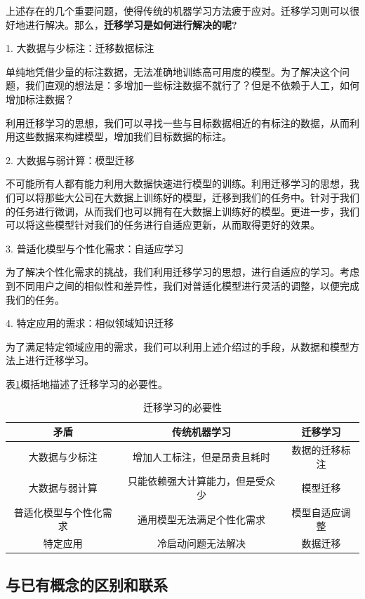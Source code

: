 上述存在的几个重要问题，使得传统的机器学习方法疲于应对。迁移学习则可以很好地进行解决。那么，\textbf{迁移学习是如何进行解决的呢?}

1. 大数据与少标注：迁移数据标注

单纯地凭借少量的标注数据，无法准确地训练高可用度的模型。为了解决这个问题，我们直观的想法是：多增加一些标注数据不就行了？但是不依赖于人工，如何增加标注数据？

利用迁移学习的思想，我们可以寻找一些与目标数据相近的有标注的数据，从而利用这些数据来构建模型，增加我们目标数据的标注。

2. 大数据与弱计算：模型迁移

不可能所有人都有能力利用大数据快速进行模型的训练。利用迁移学习的思想，我们可以将那些大公司在大数据上训练好的模型，迁移到我们的任务中。针对于我们的任务进行微调，从而我们也可以拥有在大数据上训练好的模型。更进一步，我们可以将这些模型针对我们的任务进行自适应更新，从而取得更好的效果。

3. 普适化模型与个性化需求：自适应学习

为了解决个性化需求的挑战，我们利用迁移学习的思想，进行自适应的学习。考虑到不同用户之间的相似性和差异性，我们对普适化模型进行灵活的调整，以便完成我们的任务。

4. 特定应用的需求：相似领域知识迁移

为了满足特定领域应用的需求，我们可以利用上述介绍过的手段，从数据和模型方法上进行迁移学习。

表\ref{tb-whytransfer}概括地描述了迁移学习的必要性。

\begin{table}[htbp]
	\centering
	\caption{迁移学习的必要性}
	\label{tb-whytransfer}
	\begin{tabular}{|c|c|c|}
		\hline
		\textbf{矛盾} & \textbf{传统机器学习} & \textbf{迁移学习} \\ \hline
		大数据与少标注 & 增加人工标注，但是昂贵且耗时 & 数据的迁移标注 \\ \hline
		大数据与弱计算 & 只能依赖强大计算能力，但是受众少 & 模型迁移 \\ \hline
		普适化模型与个性化需求 & 通用模型无法满足个性化需求 & 模型自适应调整 \\ \hline
		特定应用 & 冷启动问题无法解决 & 数据迁移 \\ \hline
	\end{tabular}
\end{table}

\subsection{与已有概念的区别和联系}

